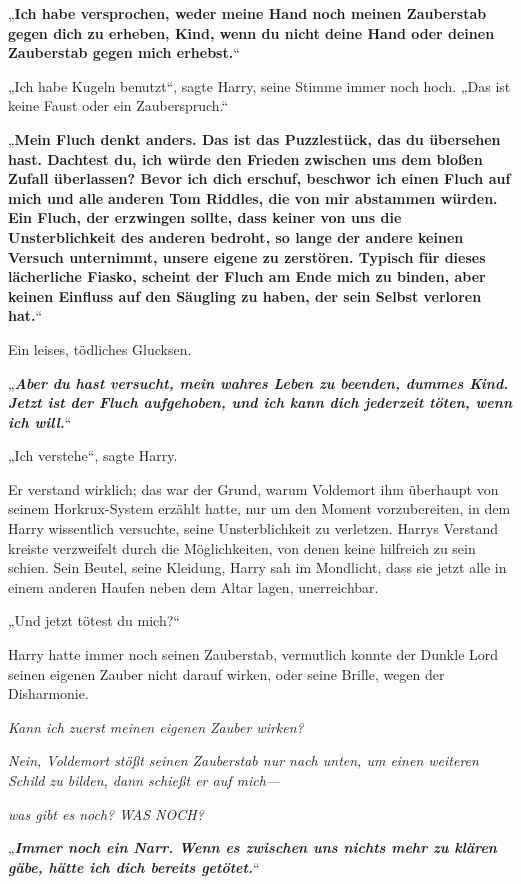 {„\textbf{Ich habe versprochen, weder meine Hand noch meinen Zauberstab gegen dich zu erheben, Kind, wenn du nicht deine Hand oder deinen Zauberstab gegen mich erhebst.}“

„Ich habe Kugeln benutzt“, sagte Harry, seine Stimme immer noch hoch. „Das ist keine Faust oder ein Zauberspruch.“

„\textbf{Mein Fluch denkt anders. Das ist das Puzzlestück, das du übersehen hast. Dachtest du, ich würde den Frieden zwischen uns dem bloßen Zufall überlassen? Bevor ich dich erschuf, beschwor ich einen Fluch auf mich und alle} \textbf{anderen Tom Riddles, die von mir abstammen würden. Ein Fluch, der erzwingen sollte, dass keiner von uns die Unsterblichkeit des anderen bedroht, so lange der andere keinen Versuch unternimmt, unsere eigene zu zerstören. Typisch für dieses lächerliche Fiasko, scheint der Fluch am Ende mich zu binden, aber keinen Einfluss auf den Säugling zu haben, der sein Selbst verloren hat.}“

Ein leises, tödliches Glucksen.

„\textbf{\emph{Aber du hast versucht, mein wahres Leben zu beenden, dummes Kind. Jetzt ist der Fluch aufgehoben, und ich kann dich jederzeit töten, wenn ich will.}}“

„Ich verstehe“, sagte Harry.

Er verstand wirklich; das war der Grund, warum Voldemort ihm überhaupt von seinem Horkrux-System erzählt hatte, nur um den Moment vorzubereiten, in dem Harry wissentlich versuchte, seine Unsterblichkeit zu verletzen. Harrys Verstand kreiste verzweifelt durch die Möglichkeiten, von denen keine hilfreich zu sein schien. Sein Beutel, seine Kleidung, Harry sah im Mondlicht, dass sie jetzt alle in einem anderen Haufen neben dem Altar lagen, unerreichbar.

„Und jetzt tötest du mich?“

Harry hatte immer noch seinen Zauberstab, vermutlich konnte der Dunkle Lord seinen eigenen Zauber nicht darauf wirken, oder seine Brille, wegen der Disharmonie.

\emph{Kann ich zuerst meinen eigenen Zauber wirken?}

\emph{Nein, Voldemort stößt seinen Zauberstab nur nach unten, um einen weiteren Schild zu bilden, dann schießt er auf mich—}

\emph{was gibt es noch? WAS NOCH?}

„\textbf{\emph{Immer noch ein Narr. Wenn es zwischen uns nichts mehr zu klären gäbe, hätte ich dich bereits getötet.}}“

}
